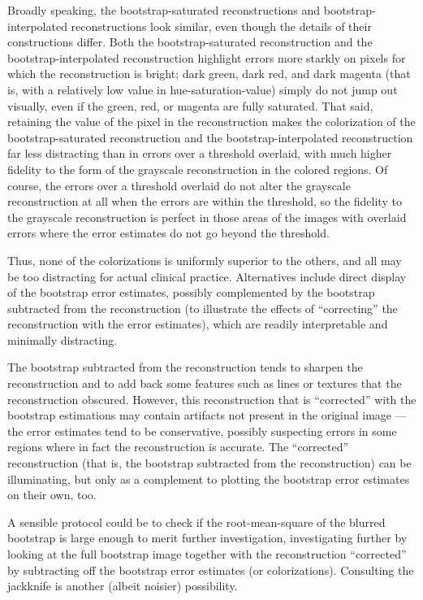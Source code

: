 \documentclass[article]{jdssv}
\begin{document}
Broadly speaking, the bootstrap-saturated reconstructions
and bootstrap-interpolated reconstructions look similar,
even though the details of their constructions differ.
Both the bootstrap-saturated reconstruction and the bootstrap-interpolated
reconstruction highlight errors more starkly on pixels
for which the reconstruction is bright; dark green, dark red, and dark magenta
(that is, with a relatively low value in hue-saturation-value) simply do not
jump out visually, even if the green, red, or magenta are fully saturated.
That said, retaining the value of the pixel in the reconstruction makes
the colorization of the bootstrap-saturated reconstruction
and the bootstrap-interpolated reconstruction far less distracting
than in errors over a threshold overlaid, with much higher fidelity
to the form of the grayscale reconstruction in the colored regions.
Of course, the errors over a threshold overlaid do not alter
the grayscale reconstruction at all when the errors are within the threshold,
so the fidelity to the grayscale reconstruction is perfect
in those areas of the images with overlaid errors where the error estimates
do not go beyond the threshold.

Thus, none of the colorizations is uniformly superior to the others,
and all may be too distracting for actual clinical practice.
Alternatives include direct display of the bootstrap error estimates,
possibly complemented by the bootstrap subtracted from the reconstruction
(to illustrate the effects of ``correcting'' the reconstruction
with the error estimates), which are readily interpretable
and minimally distracting.

The bootstrap subtracted from the reconstruction tends to sharpen
the reconstruction and to add back some features such as lines or textures
that the reconstruction obscured. However, this reconstruction that is
``corrected'' with the bootstrap estimations may contain artifacts
not present in the original image --- the error estimates
tend to be conservative, possibly suspecting errors in some regions
where in fact the reconstruction is accurate. The ``corrected'' reconstruction
(that is, the bootstrap subtracted from the reconstruction)
can be illuminating, but only as a complement
to plotting the bootstrap error estimates on their own, too.

A sensible protocol could be to check if the root-mean-square
of the blurred bootstrap is large enough to merit further investigation,
investigating further by looking at the full bootstrap image
together with the reconstruction ``corrected''
by subtracting off the bootstrap error estimates (or colorizations).
Consulting the jackknife is another (albeit noisier) possibility.
\end{document}
